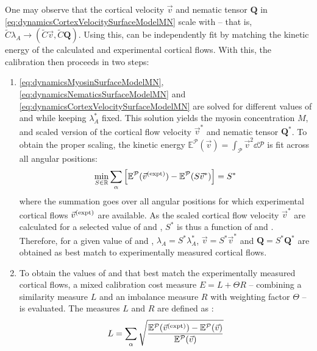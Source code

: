 One may observe that the cortical velocity $\vec{v}$ and nematic tensor $\mathbf{Q}$ in \autoref{eq:dynamicsCortexVelocitySurfaceModelMN} scale with \activeRelaxLength -- that is, $\tilde{C} \lambda_A \rightarrow (\tilde{C}\vec{v}, \tilde{C}\mathbf{Q})$. Using this, \activeRelaxLength can be independently fit by matching the kinetic energy of the calculated and experimental cortical flows. With this, the calibration then proceeds in two steps:
\begin{enumerate}
    \item \autoref{eq:dynamicsMyosinSurfaceModelMN}, \autoref{eq:dynamicsNematicsSurfaceModelMN} and \autoref{eq:dynamicsCortexVelocitySurfaceModelMN} are solved for different values of \hydrodynamicLength and \nematicLength while keeping $\lambda_A^*$ fixed. This solution yields the myosin concentration $M$, and scaled version of the cortical flow velocity $\vec{v}^*$ and nematic tensor $\mathbf{Q}^*$. To obtain the proper scaling, the kinetic energy $\mathbb{E}^\mathcal{P}(\vec{v}) = \int_\mathcal{P} \vec{v}^2 \dd{\mathcal{P}}$ is fit across all angular positions:
    \begin{equation*}
        \min_{S \in \mathbb{R}}\sum_\alpha \left[ \mathbb{E}^\mathcal{P}(\vec{v}^{(\textrm{expt})}) - \mathbb{E}^\mathcal{P}(S\vec{v}^*) \right] = S^*
    \end{equation*}
    where the summation goes over all angular positions for which experimental cortical flows $\vec{v}^{(\textrm{expt})}$ are available. As the scaled cortical flow velocity $\vec{v}^*$ are calculated for a selected value of \hydrodynamicLength and \nematicLength, $S^*$ is thus a function of \hydrodynamicLength and \nematicLength. Therefore, for a given value of \hydrodynamicLength and \nematicLength, $\lambda_A = S^*\lambda_A^*$, $\vec{v} = S^*\vec{v}^*$ and $\mathbf{Q} = S^*\mathbf{Q}^*$ are obtained as best match to experimentally measured cortical flows. 
    \item To obtain the values of \hydrodynamicLength and \nematicLength that best match the experimentally measured cortical flows, a mixed calibration cost measure $E = L + \Theta R$ -- combining a similarity measure $L$ and an imbalance measure $R$ with weighting factor $\Theta$ -- is evaluated. The measures $L$ and $R$ are defined as \citep{axisConvergence}:
    \begin{align*}
        L &= \sum_\alpha \sqrt{\frac{\mathbb{E}^\mathcal{P}(\speciesSuper{\vec{v}}{\textrm{expt}}) - \mathbb{E}^\mathcal{P}(\vec{v})}{\mathbb{E}^\mathcal{P}(\vec{v})}} \\

\end{align*}
\end{enumerate}
